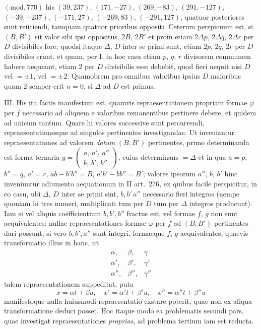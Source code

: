 $(\mathrm{mod.}\,770)$ his $(39,237)$, $(171,-27)$, $(269,-83)$, $(291,-127)$, $(-39,-237)$, $(-171,27)$, $(-269,83)$, $(-291,127)$, quatuor posteriores sunt reiiciendi, tamquam quatuor prioribus oppositi. Ceterum perspicuum est, si $(B,B')$ sit valor sibi ipsi oppositus, $2B$, $2B'$ et proin etiam $2\Delta p$, $2\Delta q$, $2\Delta r$ per $D$ divisibiles fore; quodsi itaque $\Delta$, $D$ inter se primi sunt, etiam $2p$, $2q$, $2r$ per $D$ divisibiles erunt. et quum, per I, in hoc casu etiam $p$, $q$, $r$ divisorem communem habere nequeant, etiam $2$ per $D$ divisibilis esse debebit, quod fieri nequit nisi $D$ vel $=\pm1$, vel $=\pm2$. Quamobrem pro omnibus valoribus ipsius $D$ maioribus quam $2$ semper erit $n=0$, si $\Delta$ ad $D$ est primus.

III. His ita factis manifestum est, quamvis repraesentationem propriam formae $\varphi$ per $f$ necessario ad aliquem e valoribus remanentibus pertinere debere, et quidem ad unicum tantum. Quare hi valores successive sunt percurrendi, repraesentationesque ad singulos pertinentes investigandae. Ut inveniantur repraesentationes ad valorem \textit{datum} $(B,B')$ pertinentes, primo determinanda est forma ternaria $g=\left(\begin{smallmatrix}a,\,a',\,a''\\b,\,b',\,b''\end{smallmatrix}\right)$, cuius determinans $=\Delta$ et in qua $a=p$, $b''=q$, $a'=r$, $ab-b'b''=B$, $a'b'-bb''=B'$; valores ipsorum $a''$, $b$, $b'$ hinc inveniuntur adiumento aequationum in II art.~276, ex quibus facile perspicitur, in eo casu, ubi $\Delta$, $D$ inter se primi sint, $b,b'\,a''$ necessario fieri integros (nempe quoniam hi tres numeri, multiplicati tum per $D$ tum per $\Delta$ integros producunt). Iam si vel aliquis coëfficientium $b,b',b''$ fractus est, vel formae $f$, $g$ non sunt aequivalentes: nullae repraesentationes formae $\varphi$ per $f$ ad $(B,B')$ pertinentes dari possunt; si vero $b,b',a''$ sunt integri, formaeque $f$, $g$ aequivalentes, quaevis transformatio illius in hanc, ut
\[
\begin{array}{ccc}
\alpha,&\beta,&\gamma\\
\alpha',&\beta',&\gamma'\\
\alpha'',&\beta'',&\gamma''
\end{array}
\]
talem repraesentationem suppeditat, puta
\[
x=\alpha t+\beta u,\quad x'=\alpha't+\beta'u,\quad x''=\alpha''t+\beta''u
\]
manifestoque nulla huiusmodi repraesentatio exstare poterit, quae non ex aliqua transformatione deduci posset. Hoc itaque modo ea problematis secundi pars, quae investigat repraesentationes \textit{proprias}, ad problema tertium iam est reducta.

